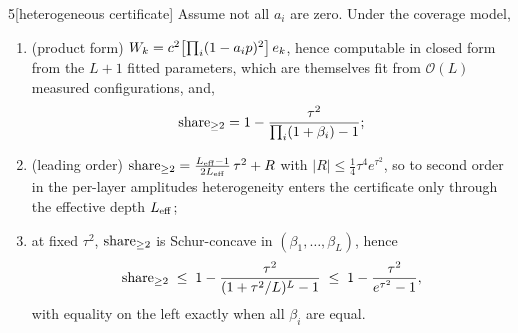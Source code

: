 \begin{customprop}{5}[heterogeneous certificate]\label{prop:hetcert}
Assume not all $a_i$ are zero. Under the coverage model,
\begin{enumerate}
\item[(i)] (product form) $W_k = c^2\bigl[\prod_i(1-a_ip)^2\bigr]\,e_{k}$, hence
  computable in closed form from the $L+1$ fitted parameters, which are themselves fit from
  $\mathcal{O}(L)$ measured configurations, and,
  \begin{equation}
    \mathrm{share}_{\ge 2} = 1 - \frac{\tau^2}{\prod_i(1+\beta_i) - 1};
    \label{eq:hetshare}
  \end{equation}
\item[(ii)] (leading order) $\mathrm{share}_{\ge 2} = \frac{L_{\mathrm{eff}}-1}{2L_{\mathrm{eff}}}\,\tau^2 + R$ with
  $|R| \le \tfrac14\tau^4 e^{\tau^2}$, so to second order in the per-layer amplitudes heterogeneity
  enters the certificate only through the effective depth $L_{\mathrm{eff}}$;
\item[(iii)] at fixed $\tau^2$, $\mathrm{share}_{\ge 2}$ is Schur-concave in
  $(\beta_1,\ldots,\beta_L)$, hence
  \[
    \mathrm{share}_{\ge 2} \;\le\; 1 - \frac{\tau^2}{(1+\tau^2/L)^L - 1} \;\le\; 1 - \frac{\tau^2}{e^{\tau^2}-1},
  \]
  with equality on the left exactly when all $\beta_i$ are equal.
\end{enumerate}
\end{customprop}

